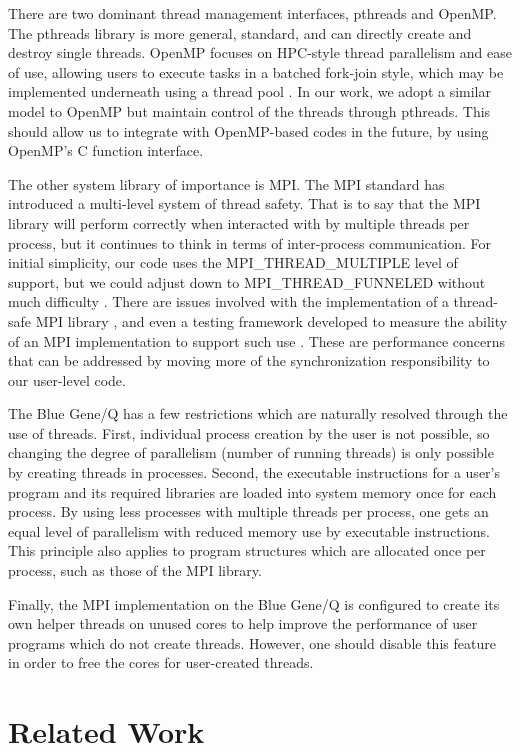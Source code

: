 \documentclass[final,1p,times]{elsarticle}
\begin{document}
There are two dominant thread management interfaces, pthreads and OpenMP.
The pthreads library is more general, standard, and can directly create
and destroy single threads.
OpenMP focuses on HPC-style thread parallelism and ease of use,
allowing users to execute tasks in a batched fork-join style,
which may be implemented underneath using a thread pool
\cite{dagum1998openmp}.
In our work, we adopt a similar model to OpenMP but
maintain control of the threads through pthreads.
This should allow us to integrate with OpenMP-based codes
in the future, by using OpenMP's C function interface.

The other system library of importance is MPI.
The MPI standard has introduced a multi-level system of thread safety.
That is to say that the MPI library will perform correctly when
interacted with by multiple threads per process, but it
continues to think in terms of inter-process communication.
For initial simplicity, our code uses the MPI\_THREAD\_MULTIPLE
level of support, but we could adjust down to MPI\_THREAD\_FUNNELED
without much difficulty \cite{balaji2008toward}.
There are issues involved with the implementation of a thread-safe
MPI library \cite{gropp2006issues}, and even a testing framework
developed to measure the ability of an MPI implementation
to support such use \cite{thakur2007test}.
These are performance concerns that can be addressed by moving
more of the synchronization responsibility to our user-level code.

The Blue Gene/Q has a few restrictions which are naturally resolved
through the use of threads.
First, individual process creation by the user is not possible, so
changing the degree of parallelism (number of running threads)
is only possible by creating threads in processes.
Second, the executable instructions for a user's program and its
required libraries are loaded into system memory once for each process.
By using less processes with multiple threads per process, one gets
an equal level of parallelism with reduced memory use by executable
instructions.
This principle also applies to program structures which are allocated
once per process, such as those of the MPI library.

Finally, the MPI implementation on the Blue Gene/Q is configured to
create its own helper threads on unused cores to help improve
the performance of user programs which do not create threads.
However, one should disable this feature in order to free the cores for
user-created threads.

\section{Related Work}
\label{sec:related}
\end{document}
